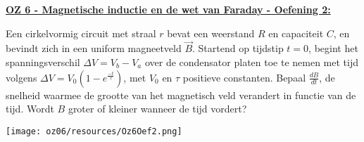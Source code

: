 \textbf{\underline{OZ 6 - Magnetische inductie en de wet van Faraday - Oefening 2:}}
\vspace{0.5cm}

    \begin{minipage}{.7\textwidth}
        Een cirkelvormig circuit met straal $r$ bevat een weerstand $R$ en capaciteit $C$, en
        bevindt zich in een uniform magneetveld $\vec{B}$. Startend op tijdstip $t = 0$, begint het spanningsverschil $\Delta V = V_b - V_a$ over de condensator platen toe te nemen met tijd volgens $\Delta V = V_0 (1- e^{\frac{-t}{\tau}})$, met $V_0$ en $\tau$ positieve constanten. Bepaal $\frac{dB}{dt}$, de snelheid waarmee de grootte van het magnetisch veld verandert in functie van de tijd. Wordt $B$ groter of kleiner wanneer de tijd vordert?
    \end{minipage}
    \hspace{0.3cm}\begin{minipage}{.2\textwidth}
        \texttt{[image: oz06/resources/Oz6Oef2.png]}
    \end{minipage}

    \begin{description}[labelwidth=1.5cm, leftmargin=!]
        \item[Geg. :]
        \item[Gevr. :] 
        \item[Opl. :]
    \end{description}


\vspace{1cm}